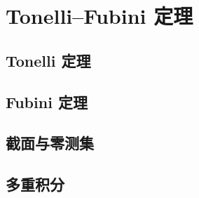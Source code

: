 \section{Tonelli–Fubini 定理}
\label{b1:sec:0703}


\subsection{Tonelli 定理}
\label{b1:subsec:070301}

\subsection{Fubini 定理}
\label{b1:subsec:070302}

\subsection{截面与零测集}
\label{b1:subsec:070303}

\subsection{多重积分}
\label{b1:subsec:070304}


